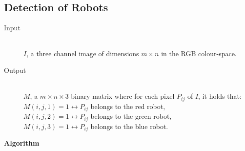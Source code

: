 \documentclass[10pt,a4paper]{article}
\begin{document}
\subsection{Detection of Robots}\label{coloralgo}
\begin{description}
\item[Input] \hfill \\
    $I$, a three channel image of dimensions $m \times n$ in the RGB colour-space.
\item[Output] \hfill \\
    $M$, a $m \times n \times 3$ binary matrix where for each pixel $P_{ij}$ of
    $I$, it holds that: \\
    $M(i,j,1) = 1 \leftrightarrow P_{ij}$ belongs to the red robot, \\
    $M(i,j,2) = 1 \leftrightarrow P_{ij}$ belongs to the green robot, \\
    $M(i,j,3) = 1 \leftrightarrow P_{ij}$ belongs to the blue robot.
\end{description}
\textbf{Algorithm}
\end{document}
